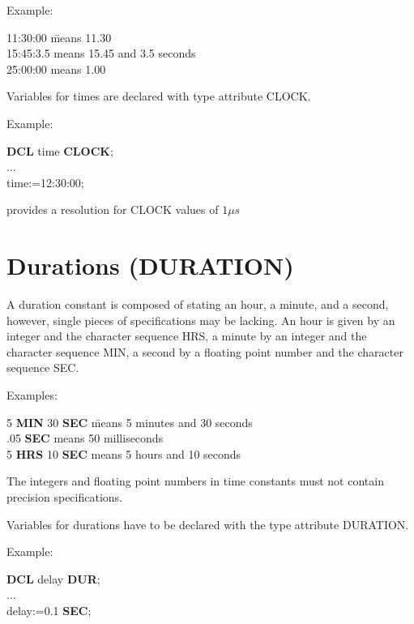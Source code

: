 Example:

\begin{tabbing}
11:30:00 \x \= means 11.30\\
15:45:3.5   \> means 15.45 and 3.5 seconds\\
25:00:00    \> means 1.00
\end{tabbing}

Variables for times are declared with type attribute CLOCK.



Example:

{\bf DCL} time {\bf CLOCK};\\
...\\
time:=12:30:00;

\OpenPEARL{} provides a resolution for CLOCK values of $1\mu s$

\section{Durations (DURATION)}   %
\label{sec_type_duration}

A duration constant is composed of stating an hour, a minute, and a
second, however, single pieces of specifications may be lacking. An hour
is given by an integer and the character sequence HRS, a minute by an
integer and the character sequence MIN, a second by a floating point
number and the character sequence SEC.

Examples:

\begin{tabbing}
5 {\bf MIN} 30 {\bf SEC} \= means 5 minutes and 30 seconds \\
.05 {\bf SEC}            \> means 50 milliseconds \\
5 {\bf HRS} 10 {\bf SEC} \> means 5 hours and 10 seconds
\end{tabbing}

The integers and floating point numbers in time constants must not
contain precision specifications.

Variables for durations have to be declared with the type attribute
DURATION.



Example:

{\bf DCL} delay {\bf DUR};\\
...\\
delay:=0.1 {\bf SEC};

